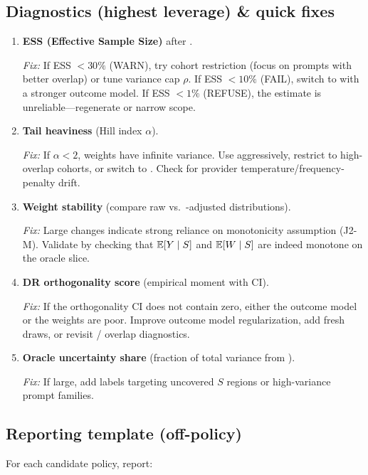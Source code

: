 \subsection{Diagnostics (highest leverage) \& quick fixes}

\begin{enumerate}[label=(\alph*)]
\item \textbf{ESS (Effective Sample Size)} after \simcal.

\emph{Fix:} If ESS $< 30\%$ (WARN), try cohort restriction (focus on prompts with better overlap) or tune \simcal{} variance cap $\rho$. If ESS $< 10\%$ (FAIL), switch to \dr{} with a stronger outcome model. If ESS $< 1\%$ (REFUSE), the estimate is unreliable---regenerate or narrow scope.

\item \textbf{Tail heaviness} (Hill index $\alpha$).

\emph{Fix:} If $\alpha < 2$, weights have infinite variance. Use \simcal{} aggressively, restrict to high-overlap cohorts, or switch to \dr. Check for provider temperature/frequency-penalty drift.

\item \textbf{Weight stability} (compare raw vs.\ \simcal-adjusted distributions).

\emph{Fix:} Large changes indicate strong reliance on monotonicity assumption (J2-M). Validate by checking that $\operatorname{\mathbb{E}}[Y \mid S]$ and $\operatorname{\mathbb{E}}[W \mid S]$ are indeed monotone on the oracle slice.

\item \textbf{DR orthogonality score} (empirical moment with CI).

\emph{Fix:} If the orthogonality CI does not contain zero, either the outcome model or the weights are poor. Improve outcome model regularization, add fresh draws, or revisit \simcal{} / overlap diagnostics.

\item \textbf{Oracle uncertainty share} (fraction of total variance from \oua).

\emph{Fix:} If large, add labels targeting uncovered $S$ regions or high-variance prompt families.
\end{enumerate}

\subsection{Reporting template (off-policy)}

For each candidate policy, report:

